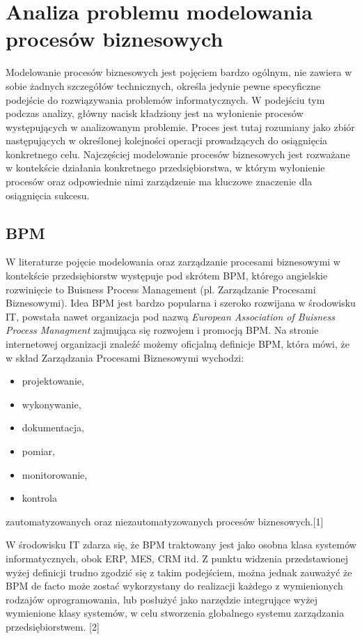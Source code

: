\chapter{Analiza problemu modelowania procesów biznesowych}
\label{cha:analizaModelowaniaProcesowBiznesowych}

Modelowanie procesów biznesowych jest pojęciem  bardzo ogólnym, nie zawiera w sobie żadnych szczegółów technicznych, określa jedynie pewne specyficzne podejście do rozwiązywania problemów informatycznych. W podejściu tym podczas analizy, główny nacisk kładziony jest na wyłonienie procesów występujących w analizowanym problemie. Proces jest tutaj rozumiany jako zbiór następujących w określonej kolejności operacji prowadzących do osiągnięcia konkretnego celu. Najczęściej modelowanie procesów biznesowych jest rozważane w kontekście działania konkretnego przedsiębiorstwa, w którym wyłonienie procesów oraz odpowiednie nimi zarządzenie ma kluczowe znaczenie dla osiągnięcia sukcesu. 


\section{BPM}
\label{sec:bpm}

W literaturze pojęcie modelowania oraz zarządzanie procesami biznesowymi w kontekście przedsiębiorstw występuje pod skrótem BPM, którego angielskie rozwinięcie to Buisness Process Management (pl.  Zarządzanie Procesami Biznesowymi). Idea BPM jest bardzo popularna i szeroko rozwijana w środowisku IT, powstała nawet organizacja pod nazwą \textit{European Association of Buisness Process Managment} zajmująca się rozwojem i promocją BPM.  Na stronie internetowej organizacji znaleźć możemy oficjalną definicje BPM, która mówi, że w skład Zarządzania Procesami Biznesowymi wychodzi:
\begin{itemize}
\item projektowanie,
\item wykonywanie,
\item dokumentacja,
\item pomiar,
\item monitorowanie,
\item kontrola
\end{itemize}
zautomatyzowanych oraz niezautomatyzowanych procesów biznesowych.[1]

W środowisku IT zdarza się, że BPM traktowany jest jako osobna klasa systemów informatycznych, obok ERP, MES, CRM itd. Z punktu widzenia przedstawionej wyżej definicji trudno zgodzić się z takim podejściem, można jednak zauważyć że BPM de facto może zostać wykorzystany do realizacji każdego z wymienionych rodzajów oprogramowania, lub posłużyć jako narzędzie integrujące wyżej wymienione klasy systemów, w celu stworzenia globalnego systemu zarządzania przedsiębiorstwem. [2]


